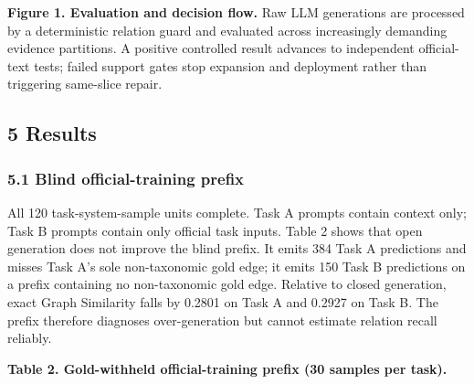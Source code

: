 \documentclass[
]{article}
\begin{document}
\textbf{Figure 1. Evaluation and decision flow.} Raw LLM generations are
processed by a deterministic relation guard and evaluated across
increasingly demanding evidence partitions. A positive controlled result
advances to independent official-text tests; failed support gates stop
expansion and deployment rather than triggering same-slice repair.

\subsection{5 Results}\label{results}

\subsubsection{5.1 Blind official-training
prefix}\label{blind-official-training-prefix}

All 120 task-system-sample units complete. Task A prompts contain
context only; Task B prompts contain only official task inputs. Table 2
shows that open generation does not improve the blind prefix. It emits
384 Task A predictions and misses Task A's sole non-taxonomic gold edge;
it emits 150 Task B predictions on a prefix containing no non-taxonomic
gold edge. Relative to closed generation, exact Graph Similarity falls
by 0.2801 on Task A and 0.2927 on Task B. The prefix therefore diagnoses
over-generation but cannot estimate relation recall reliably.

\textbf{Table 2. Gold-withheld official-training prefix (30 samples per
task).}
\end{document}
